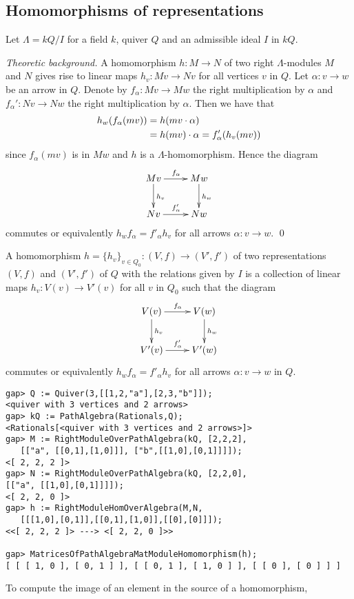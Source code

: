 \documentclass{amsart}
\renewcommand{\L}{\Lambda}
\theoremstyle{definition}
\theoremstyle{theoretic}
\newenvironment{theoback}
{\medskip\small\textit{Theoretic background.} }
{\qed\par\medskip}
\begin{document}
\subsection{Homomorphisms of representations}
Let $\L = kQ/I$ for a field $k$, quiver $Q$ and an admissible ideal
$I$ in $kQ$.  

\begin{theoback}
A homomorphism $h\colon M\to N$ of two right $\L$-modules $M$ and $N$
gives rise to linear maps $h_v\colon Mv\to Nv$ for all vertices $v$ in
$Q$.  Let $\alpha\colon v\to w$ be an arrow in $Q$.  Denote by
$f_\alpha\colon Mv\to Mw$ the right multiplication by $\alpha$ and
$f_\alpha'\colon Nv\to Nw$ the right multiplication by $\alpha$.
Then we have that
\begin{align}
h_w(f_\alpha(mv)) & = h(mv\cdot \alpha)\notag\\
& = h(mv)\cdot\alpha = f'_\alpha(h_v(mv))\notag
\end{align}
since $f_\alpha(mv)$ is in $Mw$ and $h$ is a $\L$-homomorphism.  Hence
the diagram 
\[\xymatrix{
Mv\ar[d]^{h_v}\ar[r]^{f_\alpha} &  Mw\ar[d]^{h_w}\\
Nv\ar[r]^{f'_\alpha} & Nw
}\]
commutes or equivalently $h_wf_\alpha = f'_\alpha h_v$ for all arrows
$\alpha\colon v\to w$.
\end{theoback}

A homomorphism $h=\{h_v\}_{v\in Q_0}\colon (V,f)\to (V',f')$ of two
representations $(V,f)$ and $(V',f')$ of $Q$ with the relations given
by $I$ is a collection of linear maps $h_v\colon V(v)\to V'(v)$ for
all $v$ in $Q_0$ such that the diagram 
\[\xymatrix{
V(v)\ar[d]^{h_v}\ar[r]^{f_\alpha} &  V(w)\ar[d]^{h_w}\\
V'(v)\ar[r]^{f'_\alpha} & V'(w)
}\]
commutes or equivalently $h_wf_\alpha = f'_\alpha h_v$ for all arrows
$\alpha\colon v\to w$ in $Q$.  

\begin{verbatim}
gap> Q := Quiver(3,[[1,2,"a"],[2,3,"b"]]);
<quiver with 3 vertices and 2 arrows>
gap> kQ := PathAlgebra(Rationals,Q);
<Rationals[<quiver with 3 vertices and 2 arrows>]>
gap> M := RightModuleOverPathAlgebra(kQ, [2,2,2], 
   [["a", [[0,1],[1,0]]], ["b",[[1,0],[0,1]]]]);
<[ 2, 2, 2 ]>
gap> N := RightModuleOverPathAlgebra(kQ, [2,2,0], 
[["a", [[1,0],[0,1]]]]);                     
<[ 2, 2, 0 ]>
gap> h := RightModuleHomOverAlgebra(M,N, 
   [[[1,0],[0,1]],[[0,1],[1,0]],[[0],[0]]]);             
<<[ 2, 2, 2 ]> ---> <[ 2, 2, 0 ]>>

gap> MatricesOfPathAlgebraMatModuleHomomorphism(h);                                            
[ [ [ 1, 0 ], [ 0, 1 ] ], [ [ 0, 1 ], [ 1, 0 ] ], [ [ 0 ], [ 0 ] ] ]
\end{verbatim}
To compute the image of an element in the source of a homomorphism,
\end{document}
